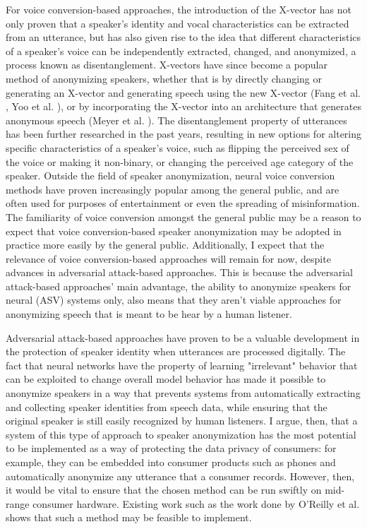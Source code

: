 \documentclass{Interspeech2024}
\begin{document}
For voice conversion-based approaches, the introduction of the X-vector has not only proven that a speaker's identity and vocal characteristics can be extracted from an utterance, but has also given rise to the idea that different characteristics of a speaker's voice can be independently extracted, changed, and anonymized, a process known as disentanglement.
X-vectors have since become a popular method of anonymizing speakers, whether that is by directly changing or generating an X-vector and generating speech using the new X-vector (Fang et al. \cite{fang_2019_xvector}, Yoo et al. \cite{yoo_2020_voice_conversion}), or by incorporating the X-vector into an architecture that generates anonymous speech (Meyer et al. \cite{meyer_2023_adversarial_gan}).
The disentanglement property of utterances has been further researched in the past years, resulting in new options for altering specific characteristics of a speaker's voice, such as flipping the perceived sex of the voice or making it non-binary, or changing the perceived age category of the speaker.
Outside the field of speaker anonymization, neural voice conversion methods have proven increasingly popular among the general public, and are often used for purposes of entertainment or even the spreading of misinformation.
The familiarity of voice conversion amongst the general public may be a reason to expect that voice conversion-based speaker anonymization may be adopted in practice more easily by the general public.
Additionally, I expect that the relevance of voice conversion-based approaches will remain for now, despite advances in adversarial attack-based approaches.
This is because the adversarial attack-based approaches' main advantage, the ability to anonymize speakers for neural (ASV) systems only, also means that they aren't viable approaches for anonymizing speech that is meant to be hear by a human listener.

Adversarial attack-based approaches have proven to be a valuable development in the protection of speaker identity when utterances are processed digitally.
The fact that neural networks have the property of learning "irrelevant" behavior that can be exploited to change overall model behavior has made it possible to anonymize speakers in a way that prevents systems from automatically extracting and collecting speaker identities from speech data, while ensuring that the original speaker is still easily recognized by human listeners.
I argue, then, that a system of this type of approach to speaker anonymization has the most potential to be implemented as a way of protecting the data privacy of consumers: for example, they can be embedded into consumer products such as phones and automatically anonymize any utterance that a consumer records.
However, then, it would be vital to ensure that the chosen method can be run swiftly on mid-range consumer hardware.
Existing work such as the work done by O'Reilly et al. \cite{oreilly_2022_voiceblock} shows that such a method may be feasible to implement.
\end{document}
